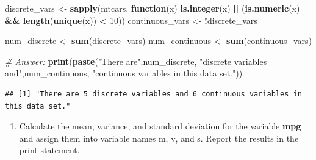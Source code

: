 \documentclass[
]{article}
\newenvironment{Shaded}{\begin{snugshade}}{\end{snugshade}}
\newcommand{\CommentTok}[1]{\textcolor[rgb]{0.56,0.35,0.01}{\textit{#1}}}
\newcommand{\ControlFlowTok}[1]{\textcolor[rgb]{0.13,0.29,0.53}{\textbf{#1}}}
\newcommand{\DecValTok}[1]{\textcolor[rgb]{0.00,0.00,0.81}{#1}}
\newcommand{\FunctionTok}[1]{\textcolor[rgb]{0.13,0.29,0.53}{\textbf{#1}}}
\newcommand{\NormalTok}[1]{#1}
\newcommand{\OtherTok}[1]{\textcolor[rgb]{0.56,0.35,0.01}{#1}}
\newcommand{\SpecialCharTok}[1]{\textcolor[rgb]{0.81,0.36,0.00}{\textbf{#1}}}
\newcommand{\StringTok}[1]{\textcolor[rgb]{0.31,0.60,0.02}{#1}}
\providecommand{\tightlist}{%
  \setlength{\itemsep}{0pt}\setlength{\parskip}{0pt}}
\begin{document}
\begin{Shaded}
\begin{Highlighting}[]
\NormalTok{discrete\_vars }\OtherTok{\textless{}{-}} \FunctionTok{sapply}\NormalTok{(mtcars, }\ControlFlowTok{function}\NormalTok{(x) }\FunctionTok{is.integer}\NormalTok{(x) }\SpecialCharTok{||}\NormalTok{ (}\FunctionTok{is.numeric}\NormalTok{(x) }\SpecialCharTok{\&\&} \FunctionTok{length}\NormalTok{(}\FunctionTok{unique}\NormalTok{(x)) }\SpecialCharTok{\textless{}} \DecValTok{10}\NormalTok{))}
\NormalTok{continuous\_vars }\OtherTok{\textless{}{-}} \SpecialCharTok{!}\NormalTok{discrete\_vars}

\NormalTok{num\_discrete }\OtherTok{\textless{}{-}} \FunctionTok{sum}\NormalTok{(discrete\_vars)}
\NormalTok{num\_continuous }\OtherTok{\textless{}{-}} \FunctionTok{sum}\NormalTok{(continuous\_vars)}

\CommentTok{\# Answer:}
\FunctionTok{print}\NormalTok{(}\FunctionTok{paste}\NormalTok{(}\StringTok{"There are"}\NormalTok{,num\_discrete, }\StringTok{"discrete variables and"}\NormalTok{,num\_continuous, }\StringTok{"continuous variables in this data set."}\NormalTok{))}
\end{Highlighting}
\end{Shaded}

\begin{verbatim}
## [1] "There are 5 discrete variables and 6 continuous variables in this data set."
\end{verbatim}

\begin{enumerate}
\def\labelenumi{\alph{enumi}.}
\setcounter{enumi}{2}
\tightlist
\item
  Calculate the mean, variance, and standard deviation for the variable
  \textbf{mpg} and assign them into variable names m, v, and s. Report
  the results in the print statement.
\end{enumerate}

\begin{Shaded}
\end{Shaded}
\end{document}
